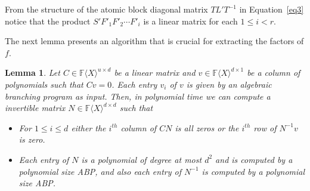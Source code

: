 \documentclass[10pt,a4paper]{article}
\newtheorem{lemma}[theorem]{Lemma}
\newcommand{\F}{\mathbb{F}}
\renewcommand{\angle}[1]{\langle #1 \rangle}
\newcommand{\FX}{\F\angle{X}}
\newcommand{\fR}{\FX}
\begin{document}
{From} the structure of the atomic block diagonal matrix $TL'T^{-1}$
in Equation~\ref{eq3} notice that the product $S'F'_1F'_2\cdots F'_i $
is a linear matrix for each $1\le i<r$.

The next lemma presents an algorithm that is crucial for extracting
the factors of $f$.

\begin{lemma}\label{triv-lem}
  Let $C\in\fR^{u\times d}$ be a linear matrix and $v\in\fR^{d\times
    1}$ be a column of polynomials such that $Cv=0$. Each entry $v_i$ of $v$ is given by an
  algebraic branching program as input. Then, in polynomial time we
  can compute a invertible matrix $N\in\fR^{d\times d}$ such that
  \begin{itemize}
  \item For $1\le i\le d$ either the $i^{th}$ column of $CN$ is all zeros
    or the $i^{th}$ row of $N^{-1}v$ is zero.
  \item Each entry of $N$ is a polynomial of degree at most $d^2$ and
    is computed by a polynomial size ABP, and also each entry of
    $N^{-1}$ is computed by a polynomial size ABP.
  \end{itemize}
%
\end{lemma}
\end{document}
